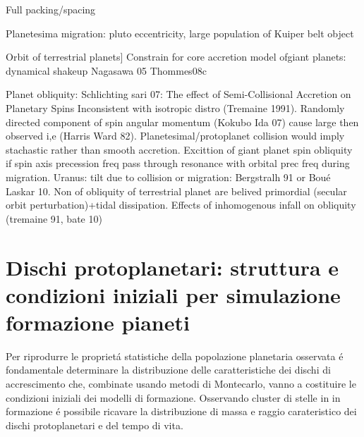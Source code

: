\begin{workout}
Full packing/spacing

Planetesima migration: pluto eccentricity, large population of Kuiper belt object

Orbit of terrestrial planets]
Constrain for core accretion model ofgiant planets: dynamical shakeup Nagasawa 05 Thommes08c

Planet obliquity:
Schlichting sari 07: The effect of Semi-Collisional Accretion on Planetary Spins
Inconsistent with isotropic distro (Tremaine 1991). Randomly directed component of spin angular momentum (Kokubo Ida 07) cause large then observed i,e (Harris Ward 82).
Planetesimal/protoplanet collision would imply stachastic rather than smooth accretion.
Excittion of giant planet spin obliquity if spin axis precession freq pass through resonance with orbital prec freq during migration.
Uranus: tilt due to collision or migration: Bergstralh 91 or Bou\'e Laskar 10.
Non of obliquity of terrestrial planet are belived primordial (secular orbit perturbation)+tidal dissipation.
Effects of inhomogenous infall on obliquity (tremaine 91, bate 10)
\end{workout}

{\let\clearpage\relax\let\cleardoublepage\relax
	\chapter{Dischi protoplanetari: struttura e condizioni iniziali per simulazione formazione pianeti}
}

Per riprodurre le propriet\'a statistiche della popolazione planetaria osservata \'e fondamentale determinare la distribuzione delle caratteristiche dei dischi di accrescimento che, combinate usando metodi di Montecarlo, vanno a costituire le condizioni iniziali dei modelli di formazione. Osservando cluster di stelle in in formazione \'e possibile ricavare la distribuzione di massa e raggio carateristico dei dischi protoplanetari e del tempo di vita.


